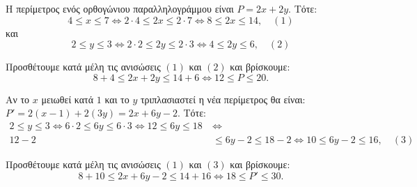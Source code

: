 
\begin{alist}
\item Η περίμετρος ενός ορθογώνιου παραλληλογράμμου είναι $P = 2x + 2y$. Τότε:
\[4 \le x \le 7 \Leftrightarrow 2 \cdot 4 \le 2x \le 2 \cdot 7 \Leftrightarrow 8 \le 2x \le 14, \quad (1)\]
και
\[2 \le y \le 3 \Leftrightarrow 2 \cdot 2 \le 2y \le 2 \cdot 3 \Leftrightarrow 4 \le 2y \le 6, \quad (2)\]

Προσθέτουμε κατά μέλη τις ανισώσεις $(1)$ και $(2)$ και βρίσκουμε:
\[8 + 4 \le 2x + 2y \le 14 + 6 \Leftrightarrow 12 \le P \le 20.\]

\item Αν το $x$ μειωθεί κατά $1$ και το $y$ τριπλασιαστεί η νέα περίμετρος θα είναι:
$P' = 2(x - 1) + 2(3y) = 2x + 6y - 2$. Τότε:
\begin{align*}
2 \le y \le 3 \Leftrightarrow 6 \cdot 2 \le 6y \le 6 \cdot 3 \Leftrightarrow 12 \le 6y \le 18 \ &\Leftrightarrow \\
12 - 2 &\le 6y - 2 \le 18 - 2 \Leftrightarrow 10 \le 6y - 2 \le 16, \quad (3)
\end{align*}

Προσθέτουμε κατά μέλη τις ανισώσεις $(1)$ και $(3)$ και βρίσκουμε:
\[8 + 10 \le 2x + 6y - 2 \le 14 + 16 \Leftrightarrow 18 \le P' \le 30.\]
\end{alist}

